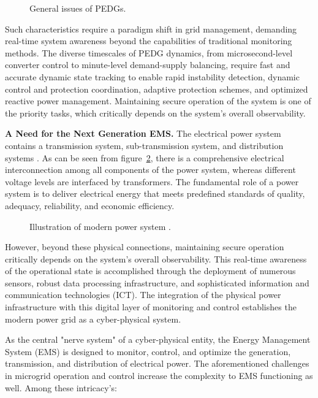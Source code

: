\begin{figure}[ht]
    \caption{General issues of PEDGs.}\label{fig:general_issues}
\end{figure}

Such characteristics require a paradigm shift in grid management, demanding real-time system awareness beyond the capabilities of traditional monitoring methods. The diverse timescales of PEDG dynamics, from microsecond-level converter control to minute-level demand-supply balancing, require fast and accurate dynamic state tracking to enable rapid instability detection, dynamic control and protection coordination, adaptive protection schemes, and optimized reactive power management. Maintaining secure operation of the system is one of the priority tasks, which critically depends on the system's overall observability.


\textbf{A Need for the Next Generation EMS.}
The electrical power system contains a transmission system, sub-transmission system, and distribution systems \autocite{kundur1994power}. As can be seen from figure~\cref{fig:ps_illustration}, there is a comprehensive electrical interconnection among all components of the power system, whereas different voltage levels are interfaced by transformers. The fundamental role of a power system is to deliver electrical energy that meets predefined standards of quality, adequacy, reliability, and economic efficiency. 

\begin{figure}[ht]
    \caption{Illustration of modern power system \cite{Prostejovsky2017}.}\label{fig:ps_illustration}
\end{figure}

However, beyond these physical connections, maintaining secure operation critically depends on the system's overall observability. This real-time awareness of the operational state is accomplished through the deployment of numerous sensors, robust data processing infrastructure, and sophisticated information and communication technologies (ICT). The integration of the physical power infrastructure with this digital layer of monitoring and control establishes the modern power grid as a cyber-physical system. 


As the central "nerve system" of a cyber-physical entity, the Energy Management System (EMS) is designed to monitor, control, and optimize the generation, transmission, and distribution of electrical power. The aforementioned challenges in microgrid operation and control increase the complexity to EMS functioning as well. Among these intricacy's: 


